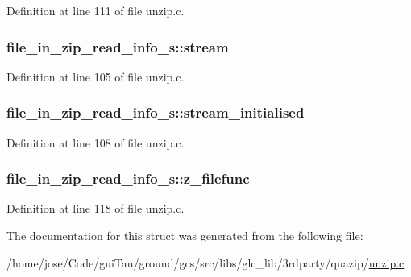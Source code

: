 Definition at line 111 of file unzip.\-c.

\hypertarget{structfile__in__zip__read__info__s_a6973c6240c02a1c8e014d6078bb2bbfc}{
\subsubsection[{stream}]{ file\-\_\-in\-\_\-zip\-\_\-read\-\_\-info\-\_\-s\-::stream}}\label{structfile__in__zip__read__info__s_a6973c6240c02a1c8e014d6078bb2bbfc}


Definition at line 105 of file unzip.\-c.

\hypertarget{structfile__in__zip__read__info__s_a8f2d03c24a7b1058288606687eb6d448}{
\subsubsection[{stream\-\_\-initialised}]{ file\-\_\-in\-\_\-zip\-\_\-read\-\_\-info\-\_\-s\-::stream\-\_\-initialised}}\label{structfile__in__zip__read__info__s_a8f2d03c24a7b1058288606687eb6d448}


Definition at line 108 of file unzip.\-c.

\hypertarget{structfile__in__zip__read__info__s_a5eae7e8fffe8d7e9e7271ce2206283e7}{
\subsubsection[{z\-\_\-filefunc}]{ file\-\_\-in\-\_\-zip\-\_\-read\-\_\-info\-\_\-s\-::z\-\_\-filefunc}}\label{structfile__in__zip__read__info__s_a5eae7e8fffe8d7e9e7271ce2206283e7}


Definition at line 118 of file unzip.\-c.



The documentation for this struct was generated from the following file\-:\begin{DoxyCompactItemize}
\item 
/home/jose/\-Code/gui\-Tau/ground/gcs/src/libs/glc\-\_\-lib/3rdparty/quazip/\hyperlink{unzip_8c}{unzip.\-c}\end{DoxyCompactItemize}
